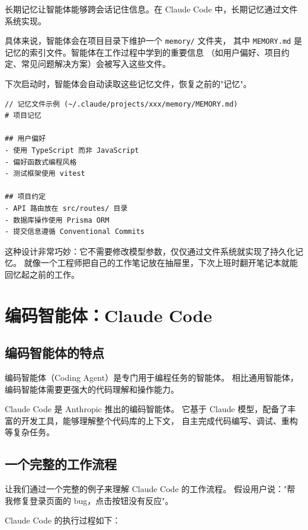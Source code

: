 长期记忆让智能体能够跨会话记住信息。在 Claude Code 中，长期记忆通过文件系统实现。

具体来说，智能体会在项目目录下维护一个 \texttt{memory/} 文件夹，
其中 \texttt{MEMORY.md} 是记忆的索引文件。智能体在工作过程中学到的重要信息
（如用户偏好、项目约定、常见问题解决方案）会被写入这些文件。

下次启动时，智能体会自动读取这些记忆文件，恢复之前的"记忆"。

\begin{verbatim}
// 记忆文件示例 (~/.claude/projects/xxx/memory/MEMORY.md)
# 项目记忆

## 用户偏好
- 使用 TypeScript 而非 JavaScript
- 偏好函数式编程风格
- 测试框架使用 vitest

## 项目约定
- API 路由放在 src/routes/ 目录
- 数据库操作使用 Prisma ORM
- 提交信息遵循 Conventional Commits
\end{verbatim}

这种设计非常巧妙：它不需要修改模型参数，仅仅通过文件系统就实现了持久化记忆。
就像一个工程师把自己的工作笔记放在抽屉里，下次上班时翻开笔记本就能回忆起之前的工作。

\section{编码智能体：Claude Code}

\subsection{编码智能体的特点}

编码智能体（Coding Agent）是专门用于编程任务的智能体。
相比通用智能体，编码智能体需要更强大的代码理解和操作能力。

Claude Code 是 Anthropic 推出的编码智能体。
它基于 Claude 模型，配备了丰富的开发工具，能够理解整个代码库的上下文，
自主完成代码编写、调试、重构等复杂任务。

\subsection{一个完整的工作流程}

让我们通过一个完整的例子来理解 Claude Code 的工作流程。
假设用户说："帮我修复登录页面的 bug，点击按钮没有反应"。

Claude Code 的执行过程如下：


